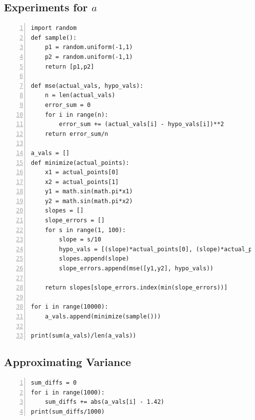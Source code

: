 \documentclass{article}
\begin{document}
\subsection{\label{prob4} Experiments for $a$}
\begin{lstlisting}[frame=single,
numbers=left,
style=Matlab-Pyglike]
import random
def sample():
    p1 = random.uniform(-1,1)
    p2 = random.uniform(-1,1)
    return [p1,p2]

def mse(actual_vals, hypo_vals):
    n = len(actual_vals)
    error_sum = 0
    for i in range(n):
        error_sum += (actual_vals[i] - hypo_vals[i])**2
    return error_sum/n

a_vals = []
def minimize(actual_points):
    x1 = actual_points[0]
    x2 = actual_points[1]
    y1 = math.sin(math.pi*x1)
    y2 = math.sin(math.pi*x2)
    slopes = []
    slope_errors = []
    for s in range(1, 100):
        slope = s/10
        hypo_vals = [(slope)*actual_points[0], (slope)*actual_points[1]]
        slopes.append(slope)
        slope_errors.append(mse([y1,y2], hypo_vals))
    
    return slopes[slope_errors.index(min(slope_errors))]

for i in range(10000):
    a_vals.append(minimize(sample()))

print(sum(a_vals)/len(a_vals))

\end{lstlisting}
\subsection{\label{prob6}Approximating Variance}
\begin{lstlisting}[frame=single,
numbers=left,
style=Matlab-Pyglike]
sum_diffs = 0
for i in range(1000):
    sum_diffs += abs(a_vals[i] - 1.42)
print(sum_diffs/1000)
\end{lstlisting}
\newpage
\end{document}
